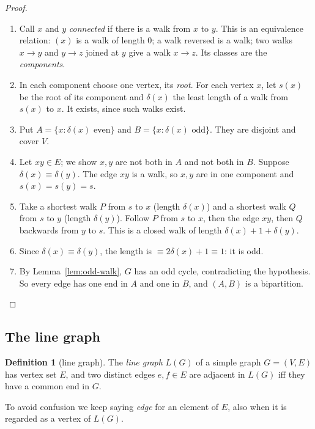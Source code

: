 \documentclass[11pt]{article}
\theoremstyle{plain}
\theoremstyle{definition}
\newtheorem{definition}[theorem]{Definition}
\theoremstyle{remark}
\newcommand{\LG}{L(G)}
\newenvironment{steps}{\begin{enumerate}[label=(\arabic*),leftmargin=2.2em,itemsep=0.35em]}{\end{enumerate}}
\begin{document}
\begin{proof}
\begin{steps}
  \item Call $x$ and $y$ \emph{connected} if there is a walk from $x$ to $y$. This is an
    equivalence relation: $(x)$ is a walk of length $0$; a walk reversed is a walk; two walks
    $x\to y$ and $y\to z$ joined at $y$ give a walk $x\to z$. Its classes are the
    \emph{components}.
  \item In each component choose one vertex, its \emph{root}. For each vertex $x$, let $s(x)$
    be the root of its component and $\delta(x)$ the least length of a walk from $s(x)$ to $x$.
    It exists, since such walks exist.
  \item Put $A=\{x:\delta(x)\text{ even}\}$ and $B=\{x:\delta(x)\text{ odd}\}$. They are
    disjoint and cover $V$.
  \item Let $xy\in E$; we show $x,y$ are not both in $A$ and not both in $B$. Suppose
    $\delta(x)\equiv\delta(y)$. The edge $xy$ is a walk, so $x,y$ are in one component and
    $s(x)=s(y)=s$.
  \item Take a shortest walk $P$ from $s$ to $x$ (length $\delta(x)$) and a shortest walk $Q$
    from $s$ to $y$ (length $\delta(y)$). Follow $P$ from $s$ to $x$, then the edge $xy$, then $Q$
    backwards from $y$ to $s$. This is a closed walk of length $\delta(x)+1+\delta(y)$.
  \item Since $\delta(x)\equiv\delta(y)$, the length is $\equiv 2\delta(x)+1\equiv 1$: it is odd.
  \item By Lemma~\ref{lem:odd-walk}, $G$ has an odd cycle, contradicting the hypothesis. So every
    edge has one end in $A$ and one in $B$, and $(A,B)$ is a bipartition. \qedhere
\end{steps}
\end{proof}

\subsection{The line graph}

\begin{definition}[line graph]\label{def:line-graph}
The \emph{line graph} $\LG$ of a simple graph $G=(V,E)$ has vertex set $E$, and two distinct
edges $e,f\in E$ are adjacent in $\LG$ iff they have a common end in $G$.
\end{definition}

To avoid confusion we keep saying \emph{edge} for an element of $E$, also when it is regarded as
a vertex of $\LG$.
\end{document}
